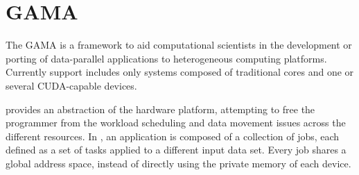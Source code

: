 \documentclass[main.tex]{subfiles}
\begin{document}
\chapter{GAMA}

The \acf{GAMA} is a framework to aid computational scientists in the development or porting of data-parallel applications to heterogeneous computing platforms. Currently \hetplat support includes only systems composed of traditional \cpus cores and one or several CUDA-capable \gpu devices.

\gama provides an abstraction of the hardware platform, attempting to free the programmer from the workload scheduling and data movement issues across the different resources. In \gama, an application is composed of a collection of jobs, each defined as a set of tasks applied to a different input data set. Every job shares a global address space, instead of directly using the private memory of each device.
\end{document}
